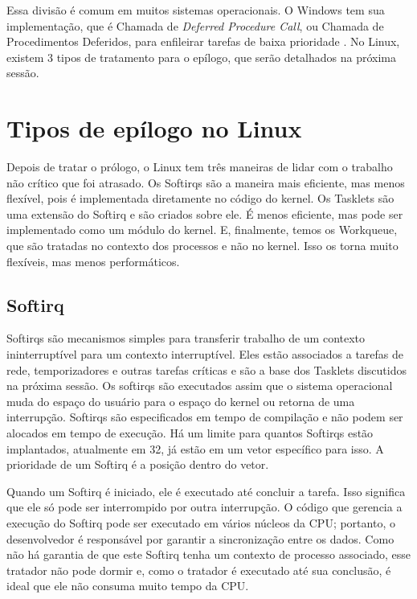 Essa divisão é comum em muitos sistemas operacionais. O Windows tem sua implementação, que é Chamada de \textit{Deferred Procedure Call}, ou Chamada de Procedimentos Deferidos, para enfileirar tarefas de baixa prioridade \cite{InsideMicrosoftWindows}. No Linux, existem 3 tipos de tratamento para o epílogo, que serão detalhados na próxima sessão.

\section{Tipos de epílogo no Linux}

Depois de tratar o prólogo, o Linux tem três maneiras de lidar com o trabalho não crítico que foi atrasado. Os Softirqs são a maneira mais eficiente, mas menos flexível, pois é implementada diretamente no código do kernel. Os Tasklets são uma extensão do Softirq e são criados sobre ele. É menos eficiente, mas pode ser implementado como um módulo do kernel. E, finalmente, temos os Workqueue, que são tratadas no contexto dos processos e não no kernel. Isso os torna muito flexíveis, mas menos performáticos. \cite{OReilly}

\subsection{Softirq}

Softirqs são mecanismos simples para transferir trabalho de um contexto ininterruptível para um contexto interruptível. Eles estão associados a tarefas de rede, temporizadores e outras tarefas críticas e são a base dos Tasklets discutidos na próxima sessão. Os softirqs são executados assim que o sistema operacional muda do espaço do usuário para o espaço do kernel ou retorna de uma interrupção. Softirqs são especificados em tempo de compilação e não podem ser alocados em tempo de execução. Há um limite para quantos Softirqs estão implantados, atualmente em 32, já estão em um vetor específico para isso. A prioridade de um Softirq é a posição dentro do vetor.

Quando um Softirq é iniciado, ele é executado até concluir a tarefa. Isso significa que ele só pode ser interrompido por outra interrupção. O código que gerencia a execução do Softirq pode ser executado em vários núcleos da CPU; portanto, o desenvolvedor é responsável por garantir a sincronização entre os dados. Como não há garantia de que este Softirq tenha um contexto de processo associado, esse tratador não pode dormir e, como o tratador é executado até sua conclusão, é ideal que ele não consuma muito tempo da CPU.


